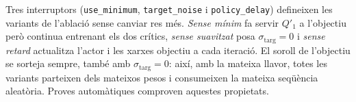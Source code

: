 Tres interruptors (\texttt{use\_minimum}, \texttt{target\_noise} i \texttt{policy\_delay}) defineixen les variants de l'ablació sense canviar res més. \emph{Sense mínim} fa servir $Q'_1$ a l'objectiu però continua entrenant els dos crítics, \emph{sense suavitzat} posa $\sigma_\text{targ} = 0$ i \emph{sense retard} actualitza l'actor i les xarxes objectiu a cada iteració. El soroll de l'objectiu se sorteja sempre, també amb $\sigma_\text{targ} = 0$: així, amb la mateixa llavor, totes les variants parteixen dels mateixos pesos i consumeixen la mateixa seqüència aleatòria. Proves automàtiques comproven aquestes propietats.
